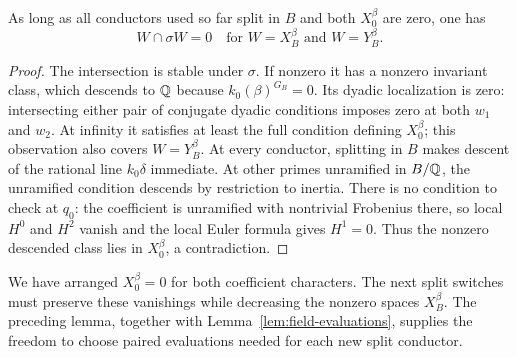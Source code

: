 \begin{lemma}\label{lem:disjoint-conjugate-selmer}
As long as all conductors used so far split in $B$ and both
$X_0^\beta$ are zero, one has
\[
 W\cap\sigma W=0
        \quad\text{for }W=X_B^\beta\text{ and }W=Y_B^\beta.
\]
\end{lemma}

\begin{proof}
The intersection is stable under $\sigma$.  If nonzero it has a
nonzero invariant class, which descends to $\mathbb Q$ because
$k_0(\beta)^{G_B}=0$.  Its dyadic localization is zero: intersecting
either pair of conjugate dyadic conditions imposes zero at both
$w_1$ and $w_2$.  At infinity it satisfies at least the full condition
defining $X_0^\beta$; this observation also covers $W=Y_B^\beta$.
At every conductor, splitting in $B$ makes descent of the rational
line $k_0\delta$ immediate.  At other primes unramified in $B/\mathbb Q$,
the unramified condition descends by restriction to inertia.
There is no condition to check at $q_0$: the coefficient is
unramified with nontrivial Frobenius there, so local $H^0$ and
$H^2$ vanish and the local Euler formula gives $H^1=0$.
Thus the nonzero descended class lies in $X_0^\beta$, a contradiction.
\end{proof}

We have arranged $X_0^\beta=0$ for both coefficient characters.
The next split switches must preserve these vanishings while decreasing
the nonzero spaces $X_B^\beta$.  The preceding lemma, together with
Lemma~\ref{lem:field-evaluations}, supplies the freedom to choose
paired evaluations needed for each new split conductor.

